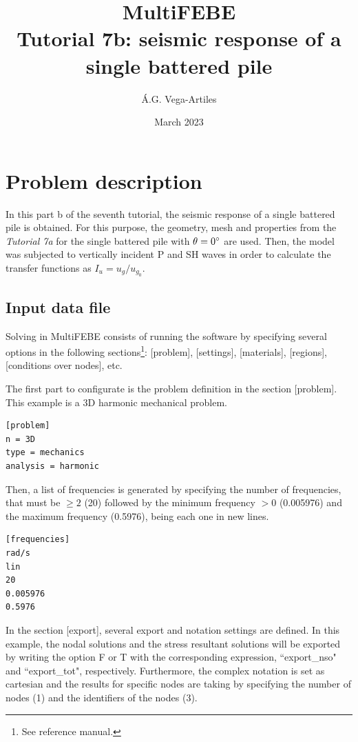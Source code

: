 \documentclass[a4]{article}
\title{MultiFEBE \\ Tutorial 7b: seismic response of a single battered pile}
\author{\'A.G. Vega-Artiles}
\date{March 2023}
\begin{document}
\maketitle

\tableofcontents

\section{Problem description}

In this part b of the seventh tutorial, the seismic response of a single battered pile is obtained. For this purpose, the geometry, mesh and properties from the \textit{Tutorial 7a} for the single battered pile with $\theta=0\degree$ are used. Then, the model was subjected to vertically incident P and SH waves in order to calculate the transfer functions as $I_u=u_g/u_{g_0}$.

\subsection{Input data file}
Solving in MultiFEBE consists of running the software by specifying several options in the following sections\footnote{See reference manual.}: [problem], [settings], [materials], [regions], [conditions over nodes], etc.

The first part to configurate is the problem definition in the section [problem]. This example is a 3D harmonic mechanical problem.

\begin{Verbatim}	
[problem]
n = 3D
type = mechanics
analysis = harmonic
\end{Verbatim}

Then, a list of frequencies is generated by specifying the number of frequencies, that must be $\geq 2$ (20) followed by the minimum frequency $>0$ (0.005976) and the maximum frequency (0.5976), being each one in new lines.

\begin{Verbatim}
[frequencies]
rad/s
lin
20
0.005976
0.5976
\end{Verbatim}

In the section [export], several export and notation settings are defined. In this example, the nodal solutions and the stress resultant solutions will be exported by writing the option F or T with the corresponding expression, ``export\_nso" and ``export\_tot", respectively. Furthermore, the complex notation is set as cartesian and the results for specific nodes are taking by specifying the number of nodes (1) and the identifiers of the nodes (3). 
\end{document}
